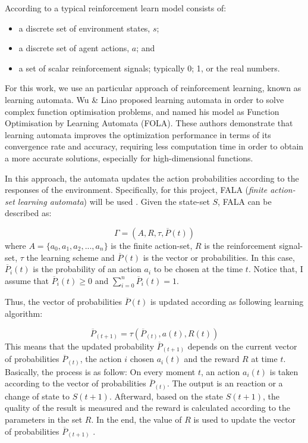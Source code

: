 	According to \cite{Sutton:1998} a typical reinforcement learn model consists of:
	
	\begin{itemize}
		\item a discrete set of environment states, $s$;
		\item a discrete set of agent actions, $a$; and
		\item a set of scalar reinforcement signals; typically {0; 1}, or the real numbers.
	\end{itemize}
	
	For this work, we use an particular approach of reinforcement learning, known as learning automata. Wu \& Liao \cite{Wu:2013} proposed learning automata in order to solve complex function optimisation problems, and named his model as Function Optimisation by Learning Automata (FOLA). These authors demonstrate that learning automata improves the optimization performance in terms of its convergence rate and accuracy, requiring less computation time in order to obtain a more accurate solutions, especially for high-dimensional functions.
	
	In this approach, the automata updates the action probabilities according to the responses of the environment. Specifically, for this project, FALA (\emph{finite action-set learning automata}) will be used \cite{Narendra:1989}. Given the state-set $S$, FALA can be described as:
	
	\begin{equation}
	\label{eq: FALA}
	\Gamma = (A,R,\tau,\overline{P}(t))
	\end{equation}
	where $A = \{a_0,a_1,a_2,...,a_n\}$ is the finite action-set, $R$ is the reinforcement signal-set, $\tau$ the learning scheme and $\overline{P}(t)$ is the vector or probabilities. In this case, $\overline{P}_{i}(t)$ is the probability of an action $a_i$ to be chosen at the time $t$. Notice that, I assume that $\overline{P}_{i}(t) \geq 0$ and $\sum_{i=0}^{n} \overline{P}_{i}(t) = 1$.
	
	Thus, the vector of probabilities $\overline{P}(t)$ is updated according as following learning algorithm:
	
	\begin{equation}
	\label{eq: updateFALA}
	\overline{P}_{(t+1)} = \tau(\overline{P}_{(t)},a(t),R(t))
	\end{equation}
	This means that the updated probability $\overline{P}_{(t+1)}$ depends on the current vector of probabilities $\overline{P}_{(t)}$, the action $i$ chosen $a_{i}(t)$ and the reward $R$ at time $t$. Basically, the process is as follow: On every moment $t$, an action $a_{i}(t)$ is taken according to the vector of probabilities $\overline{P}_{(t)}$. The output is an reaction or a change of state to $S(t+1)$. Afterward, based on the state $S(t+1)$, the quality of the result is measured and the reward is calculated according to the parameters in the set $R$. In the end, the value of $R$ is used to update the vector of probabilities $\overline{P}_{(t+1)}$ \cite{Narendra:1989}. 
	
	\vspace{0.6cm}